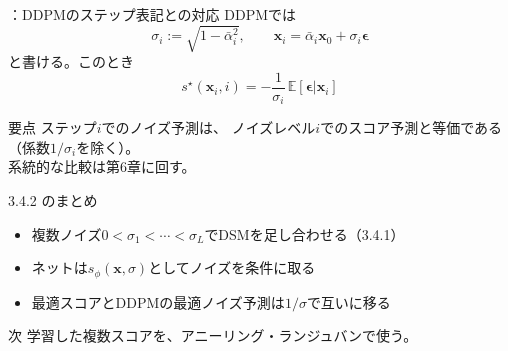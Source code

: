 \assuppl
\begin{frame}{\supplmark：DDPMのステップ表記との対応}
    DDPMでは
    \[
        \sigma_i:=\sqrt{1-\bar{\alpha}_i^{2}},
        \qquad
        \bm{x}_i=\bar{\alpha}_i\bm{x}_0+\sigma_i\bm{\epsilon}
    \]
    と書ける。このとき
    \[
        s^{\star}(\bm{x}_i,i)
        =
        -\frac{1}{\sigma_i}\,\mathbb{E}[\bm{\epsilon}|\bm{x}_i]
    \]
    \begin{exampleblock}{要点}
        ステップ$i$でのノイズ予測は、
        ノイズレベル$i$でのスコア予測と等価である
        （係数$1/\sigma_i$を除く）。\\
        系統的な比較は第6章に回す。
    \end{exampleblock}
\end{frame}
\asmain
\begin{frame}{3.4.2 のまとめ}
    \begin{itemize}
        \item 複数ノイズ$0<\sigma_1<\cdots<\sigma_L$でDSMを足し合わせる（3.4.1）
        \item ネットは$s_\phi(\bm{x},\sigma)$としてノイズを条件に取る
        \item 最適スコアとDDPMの最適ノイズ予測は$1/\sigma$で互いに移る
    \end{itemize}
    \begin{block}{次}
        学習した複数スコアを、アニーリング・ランジュバンで使う。
    \end{block}
\end{frame}
